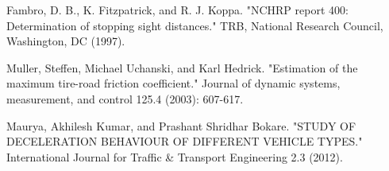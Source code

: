 \documentclass[conference]{IEEEtran}
\begin{document}
\begin{thebibliography}{00}
 Fambro, D. B., K. Fitzpatrick, and R. J. Koppa. "NCHRP report 400: Determination of stopping sight distances." TRB, National Research Council, Washington, DC (1997). 

 Muller, Steffen, Michael Uchanski, and Karl Hedrick. "Estimation of the maximum tire-road friction coefficient." Journal of dynamic systems, measurement, and control 125.4 (2003): 607-617. 

Maurya, Akhilesh Kumar, and Prashant Shridhar Bokare. "STUDY OF DECELERATION BEHAVIOUR OF DIFFERENT VEHICLE TYPES." International Journal for Traffic \& Transport Engineering 2.3 (2012). 


\end{thebibliography}
\vspace{12pt}



\end{document}
